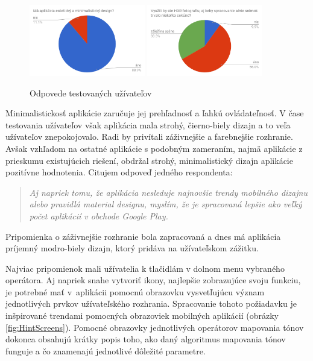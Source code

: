 \begin{figure}[ht!]
	\includegraphics[width=0.45\textwidth]{figures/tests/charts/chart5}
	\includegraphics[width=0.45\textwidth]{figures/tests/charts/chart6}
  \caption{Odpovede testovaných užívateľov}
  \label{fig:feedbacks}
\end{figure}

Minimalistickosť aplikácie zaručuje jej prehľadnosť a ľahkú ovládateľnosť. V čase testovania užívateľov však aplikácia mala strohý,
čierno-biely dizajn a to veľa užívateľov znepokojovalo. Radi by privítali záživnejšie a farebnejšie rozhranie. Avšak vzhľadom
na ostatné aplikácie s podobným zameraním, najmä aplikácie z prieskumu existujúcich riešení, obdržal strohý, minimalistický
dizajn aplikácie pozitívne hodnotenia. Citujem odpoveď jedného respondenta:
\begin{quote}
	\textit{Aj napriek tomu, že aplikácia nesleduje najnovšie trendy mobilného dizajnu alebo pravidlá material
	designu, myslím, že je spracovaná lepšie ako veľký počet aplikácií v obchode Google Play.}
\end{quote}
Pripomienka o záživnejšie rozhranie bola zapracovaná a dnes má aplikácia príjemný modro-biely dizajn, ktorý pridáva na užívateľskom zážitku.

Najviac pripomienok mali užívatelia k tlačidlám v dolnom menu vybraného operátora. Aj napriek snahe vytvoriť ikony,
najlepšie zobrazujúce svoju funkciu, je potrebné mať v~aplikácii pomocnú obrazovku vysvetľujúcu význam jednotlivých
prvkov užívateľského rozhrania. Spracovanie tohoto požiadavku je inšpirované trendami pomocných obrazoviek mobilných aplikácií
(obrázky \ref{fig:HintScreens}). Pomocné obrazovky jednotlivých operátorov mapovania tónov dokonca obsahujú krátky popis toho,
ako daný algoritmus mapovania tónov funguje a čo znamenajú jednotlivé dôležité parametre.

